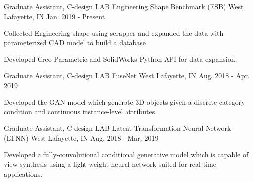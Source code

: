 


\begin{cventries}

\cventry
{Graduate Assistant, C-design LAB} %
{Engineering Shape Benchmark (ESB)} %
{West Lafayette, IN} %
{Jan. 2019 - Present} %
{ %
\begin{cvitems}
\item {Collected Engineering shape using scrapper and expanded the data with parameterized CAD model to build a database}
\item {Developed Creo Parametric and SolidWorks Python API for data expansion.}
\end{cvitems}
}

\cventry
{Graduate Assistant, C-design LAB} %
{FuseNet} %
{West Lafayette, IN} %
{Aug. 2018 - Apr. 2019} %
{ %
\begin{cvitems}
\item {Developed the GAN model which generate 3D objects given a discrete
category condition and continuous instance-level attributes.}
\end{cvitems}
}



\cventry
{Graduate Assistant, C-design LAB} %
{Latent Transformation Neural Network (LTNN)} %
{West Lafayette, IN} %
{Aug. 2018 - Mar. 2019} %
{ %
\begin{cvitems}
\item {Developed a fully-convolutional conditional generative model which is capable of view synthesis using a light-weight neural network suited for real-time applications.}
\end{cvitems}
}


\end{cventries}
